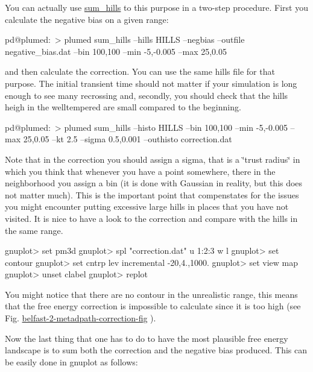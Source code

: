 You can actually use \hyperlink{sum_hills}{sum\+\_\+hills} to this purpose in a two-\/step procedure. First you calculate the negative bias on a given range\+:

\begin{DoxyVerb}pd@plumed:~> plumed sum_hills --hills HILLS --negbias  --outfile negative_bias.dat --bin 100,100 --min -5,-0.005 --max 25,0.05
\end{DoxyVerb}


and then calculate the correction. You can use the same hills file for that purpose. The initial transient time should not matter if your simulation is long enough to see many recrossing and, secondly, you should check that the hills heigh in the welltempered are small compared to the beginning.

\begin{DoxyVerb}pd@plumed:~> plumed sum_hills --histo HILLS --bin 100,100 --min -5,-0.005 --max 25,0.05 --kt 2.5 --sigma 0.5,0.001 --outhisto correction.dat
\end{DoxyVerb}


Note that in the correction you should assign a sigma, that is a \char`\"{}trust radius\char`\"{} in which you think that whenever you have a point somewhere, there in the neighborhood you assign a bin (it is done with Gaussian in reality, but this does not matter much). This is the important point that compenstates for the issues you might encounter putting excessive large hills in places that you have not visited. It is nice to have a look to the correction and compare with the hills in the same range.

\begin{DoxyVerb}gnuplot> set pm3d
gnuplot> spl "correction.dat" u 1:2:3 w l
gnuplot> set contour
gnuplot> set cntrp lev incremental -20,4.,1000.
gnuplot> set view map
gnuplot> unset clabel 
gnuplot> replot 
\end{DoxyVerb}


You might notice that there are no contour in the unrealistic range, this means that the free energy correction is impossible to calculate since it is too high (see Fig. \hyperlink{belfast-2_belfast-2-metadpath-correction-fig}{belfast-\/2-\/metadpath-\/correction-\/fig} ).

\label{belfast-2_belfast-2-metadpath-correction-fig}%
\hypertarget{belfast-2_belfast-2-metadpath-correction-fig}{}%


Now the last thing that one has to do to have the most plausible free energy landscape is to sum both the correction and the negative bias produced. This can be easily done in gnuplot as follows\+:

